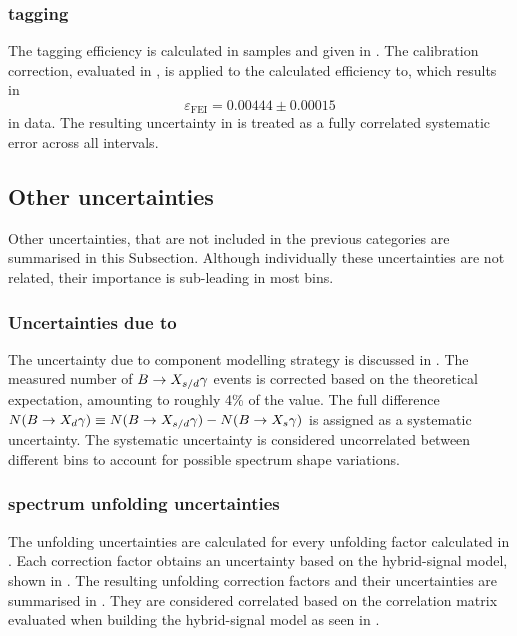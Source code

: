 \subsubsection{\texorpdfstring{\BtoXsgamma}{B->Xs gamma} tagging}

The tagging efficiency is calculated in \MC samples and given in .
The \FEI calibration correction, evaluated in , is applied to the calculated efficiency to, which results in
\begin{equation}\label{eq:tag_efficiency_with_uncertainty}
    \varepsilon_{\mathrm{FEI}} = 0.00444\pm0.00015
\end{equation}
in data.
The resulting uncertainty in  is treated as a fully correlated systematic error across all \EB intervals.

\subsection{Other uncertainties}\label{sec:other_uncertainties}

Other uncertainties, that are not included in the previous categories are summarised in this Subsection.
Although individually these uncertainties are not related, their importance is sub-leading in most \EB bins.

\subsubsection{Uncertainties due to \texorpdfstring{\BtoXdgamma}{B->Xd gamma}}\label{sec:xdgamma_systematic}

The uncertainty due to \BtoXdgamma component modelling strategy is discussed in .
The measured number of $\BtoXsdgamma$ events is corrected based on the theoretical \BtoXdgamma expectation, amounting to roughly 4\% of the value.
The full difference $N(\BtoXdgamma) \equiv N(\BtoXsdgamma)-N(\BtoXsgamma)$ is assigned as a systematic uncertainty.
The systematic uncertainty is considered uncorrelated between different \EB bins to account for possible spectrum shape variations.

\subsubsection{\texorpdfstring{\EB}{EB} spectrum unfolding uncertainties}\label{sec:unfolding_systematic}

The unfolding uncertainties are calculated for every unfolding factor calculated in .
Each correction factor obtains an uncertainty based on the hybrid-signal model, shown in .
The resulting unfolding correction factors and their uncertainties are summarised in .
They are considered correlated based on the correlation matrix evaluated when building the hybrid-signal model as seen in .

